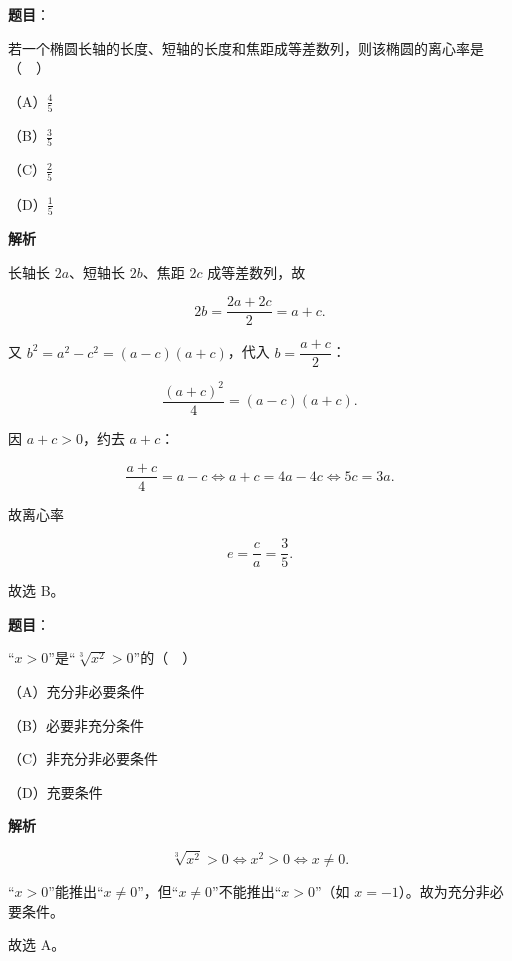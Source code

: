 \begin{answer}

\textbf{题目}：

若一个椭圆长轴的长度、短轴的长度和焦距成等差数列，则该椭圆的离心率是（　）

（A）$\frac45$

（B）$\frac35$

（C）$\frac25$

（D）$\frac15$

\textbf{解析}

长轴长 $2a$、短轴长 $2b$、焦距 $2c$ 成等差数列，故

\nopagebreak[4]
\[2b=\frac{2a+2c}{2}=a+c.\]

又 $b^2=a^2-c^2=(a-c)(a+c)$，代入 $b=\dfrac{a+c}{2}$：

\nopagebreak[4]
\[\frac{(a+c)^2}{4}=(a-c)(a+c).\]

因 $a+c>0$，约去 $a+c$：

\nopagebreak[4]
\[\frac{a+c}{4}=a-c\iff a+c=4a-4c\iff 5c=3a.\]

故离心率

\nopagebreak[4]
\[e=\frac ca=\frac35.\]

故选 B。


\end{answer}
\begin{answer}

\textbf{题目}：

“$x>0$”是“$\sqrt[3]{x^2}>0$”的（　）

（A）充分非必要条件

（B）必要非充分条件

（C）非充分非必要条件

（D）充要条件

\textbf{解析}

\nopagebreak[4]
\[\sqrt[3]{x^2}>0\iff x^2>0\iff x\neq0.\]

“$x>0$”能推出“$x\neq0$”，但“$x\neq0$”不能推出“$x>0$”（如 $x=-1$）。故为充分非必要条件。

故选 A。


\end{answer}
